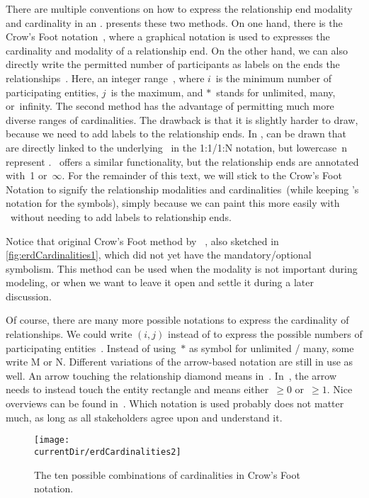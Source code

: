 There are multiple conventions on how to express the relationship end modality and cardinality in an .
 presents these two methods.
On one hand, there is the Crow's Foot notation~\cite{E1976BDSMEWACE,CM2000MDMAUDA,S2024D:CDMERDE}, where a graphical notation is used to expresses the cardinality and modality of a relationship end.
On the other hand, we can also directly write the permitted number of participants as labels on the ends the relationships~\cite{P2006CITRD:ERMI}.
Here, an integer range~, where $i$~is the minimum number of participating entities, $j$~is the maximum, and $*$~stands for unlimited, many, or~infinity.
The second method has the advantage of permitting much more diverse ranges of cardinalities.
The drawback is that it is slightly harder to draw, because we need to add labels to the relationship ends.
In \libreofficeBase,  can be drawn that are directly linked to the underlying \db\ in the 1:1/1:N notation, but lowercase~n represent .
\microsoftAccess\ offers a similar functionality, but the relationship ends are annotated with~1 or~$\infty$.
For the remainder of this text, we will stick to the Crow's Foot Notation to signify the relationship modalities and cardinalities~(while keeping \citeauthor{C1976TERMTAUVOD}'s notation for the symbols), simply because we can paint this more easily with \yEd\ without needing to add labels to relationship ends.

Notice that original Crow's Foot method by \citeauthor{E1976BDSMEWACE}~\cite{E1976BDSMEWACE}, also sketched in \cref{fig:erdCardinalities1}, which did not yet have the mandatory/optional symbolism.
This method can be used when the modality is not important during modeling, or when we want to leave it open and settle it during a later discussion.

Of course, there are many more possible notations to express the cardinality of relationships.
We could write $(i,j)$ instead of  to express the possible numbers of participating entities~\cite{SS2005EIDDDFDB:CDDICAMP,G2011EW2ITDS:CMUTERM}.
Instead of using~$*$ as symbol for unlimited / many, some write M or N.
Different variations of the arrow-based notation are still in use as well.
An arrow touching the relationship diamond means  in~\cite{V1999C5DMS:CDUTERM}.
In~\cite{G2011EW2ITDS:CMUTERM}, the arrow needs to instead touch the entity rectangle and means either~$\geq0$ or~$\geq1$.
Nice overviews can be found in~\cite{B2025DS:AGTTERDE,S2012IITDM:AAAPGTERM}.
Which notation is used probably does not matter much, as long as all stakeholders agree upon and understand it.%
%
\begin{figure}%
\centering%
\texttt{[image: \\currentDir/erdCardinalities2]}%
\caption{The ten possible combinations of cardinalities in Crow's Foot notation.}%
\label{fig:erdCardinalities2}%
\end{figure}%

